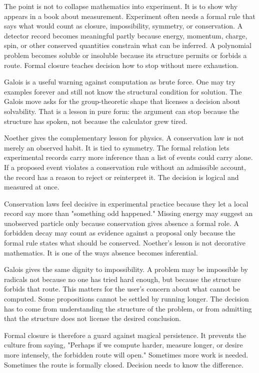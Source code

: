 The point is not to collapse mathematics into experiment. It is to show why
 appears in a book about measurement. Experiment often needs a
formal rule that says what would count as closure, impossibility, symmetry,
or conservation. A detector record becomes meaningful partly because energy,
momentum, charge, spin, or other conserved quantities constrain what can be
inferred. A polynomial problem becomes soluble or insoluble because its
structure permits or forbids a route. Formal closure teaches decision how to
stop without mere exhaustion.

Galois is a useful warning against computation as brute force. One may try
examples forever and still not know the structural condition for solution.
The Galois move asks for the group-theoretic shape that licenses a decision
about solvability. That is a  lesson in pure form: the argument
can stop because the structure has spoken, not because the calculator grew
tired.

Noether gives the complementary lesson for physics. A conservation law is not
merely an observed habit. It is tied to symmetry. The formal relation lets
experimental records carry more inference than a list of events could carry
alone. If a proposed event violates a conservation rule without an admissible
account, the record has a reason to reject or reinterpret it. The decision is
logical and measured at once.

Conservation laws feel decisive in experimental practice because they let a
local record say more than "something odd happened." Missing energy
may suggest an unobserved particle only because conservation gives absence a
formal role. A forbidden decay may count as evidence against a proposal only
because the formal rule states what should be conserved. Noether's lesson is
not decorative mathematics. It is one of the ways absence becomes inferential.

Galois gives the same dignity to impossibility. A problem may be impossible
by radicals not because no one has tried hard enough, but because the
structure forbids that route. This matters for the user's concern about what
cannot be computed. Some propositions cannot be settled by running longer.
The decision has to come from understanding the structure of the problem, or
from admitting that the structure does not license the desired conclusion.

Formal closure is therefore a guard against magical persistence. It prevents
the culture from saying, "Perhaps if we compute harder, measure longer, or
desire more intensely, the forbidden route will open." Sometimes more work is
needed. Sometimes the route is formally closed. Decision needs to know the
difference.

